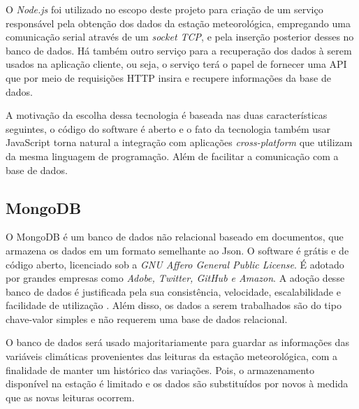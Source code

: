 O \textit{Node.js} foi utilizado no escopo deste projeto para criação de um serviço responsável pela obtenção dos dados da estação meteorológica, empregando uma comunicação serial através de um \textit{socket TCP}, e pela inserção posterior desses no banco de dados. Há também outro serviço para a recuperação dos dados à serem usados na aplicação cliente, ou seja, o serviço terá o papel de fornecer uma API que por meio de requisições HTTP insira e recupere informações da base de dados.

A motivação da escolha dessa tecnologia é baseada nas duas características seguintes, o código do software é aberto e o fato da tecnologia também usar JavaScript torna natural a integração com aplicações \textit{cross-platform} que utilizam da mesma linguagem de programação. Além de facilitar a comunicação com a base de dados.


\subsection{MongoDB} \label{subsec:MongoDB}

O MongoDB é um banco de dados não relacional baseado em documentos, que armazena os dados em um formato semelhante ao Json. O software é grátis e de código aberto, licenciado sob a \textit{GNU Affero General Public License}. É adotado por grandes empresas como \textit{Adobe, Twitter, GitHub e Amazon}. A adoção desse banco de dados é justificada pela sua consistência, velocidade, escalabilidade e facilidade de utilização \cite{SITEMONGODB}. Além disso, os dados a serem trabalhados são do tipo chave-valor simples e não requerem uma base de dados relacional.

O banco de dados será usado majoritariamente para guardar as informações das variáveis climáticas provenientes das leituras da estação meteorológica, com a finalidade de manter um histórico das variações. Pois, o armazenamento disponível na estação é limitado e os dados são substituídos por novos à medida que as novas leituras ocorrem.





